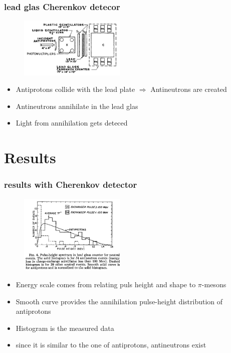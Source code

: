 \documentclass{beamer}
\begin{document}
\begin{frame}
\frametitle{lead glas Cherenkov detecor}
\begin{figure}
\includegraphics[width=0.45\textwidth]{detector}
\end{figure}

\begin{itemize}
  \item Antiprotons collide with the lead plate $\Rightarrow$ Antineutrons are created
  \item Antineutrons annihilate in the lead glas
  \item Light from annihilation gets deteced
\end{itemize}
\end{frame}


\section{Results}

\begin{frame}
\frametitle{results with Cherenkov detector}
\begin{figure}
\includegraphics[width=0.45\textwidth]{result1}
\end{figure}
\begin{itemize}
  \item Energy scale comes from relating puls height and shape to $\pi$-mesons
  \item Smooth curve provides the annihilation pulse-height distribution of antiprotons
  \item Histogram is the measured data
  \item since it is similar to the one of antiprotons, antineutrons exist
\end{itemize}
\end{frame}
\end{document}
